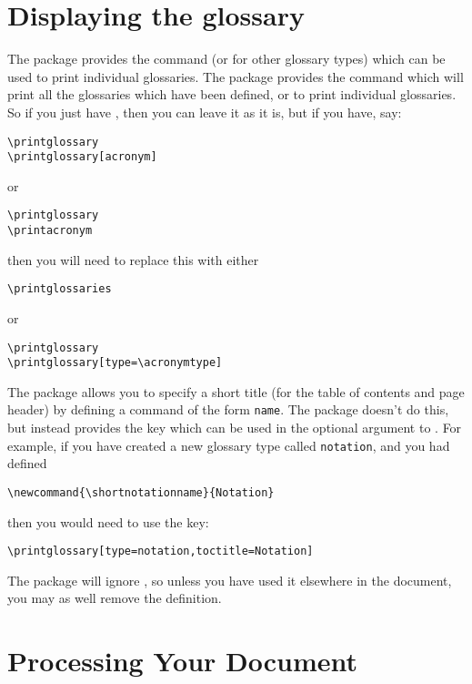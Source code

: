 \documentclass{nlctdoc}
\begin{document}
\section{Displaying the glossary}

The  package provides the command 
(or  for other glossary types) which
can be used to print individual glossaries. The 
package provides the command  which 
will print all the glossaries which have been defined, or
 to print individual glossaries.
So if you just have , then you can leave it as
it is, but if you have, say:
\begin{verbatim}
\printglossary
\printglossary[acronym]
\end{verbatim}
or
\begin{verbatim}
\printglossary
\printacronym
\end{verbatim}
then you will need to replace this with either
\begin{verbatim}
\printglossaries
\end{verbatim}
or 
\begin{verbatim}
\printglossary
\printglossary[type=\acronymtype]
\end{verbatim}

The  package allows you to specify a short title
(for the table of contents and page header) by defining a command of
the form \texttt{name}. The
 package doesn't do this, but instead provides
the  key which can be used in the
optional argument to . For example, if you have
created a new glossary type called \texttt{notation}, and you had
defined
\begin{verbatim}
\newcommand{\shortnotationname}{Notation}
\end{verbatim}
then you would need to use the  key:
\begin{verbatim}
\printglossary[type=notation,toctitle=Notation]
\end{verbatim}
The  package will ignore ,
so unless you have used it elsewhere in the document, you may as
well remove the definition.

\section{Processing Your Document}
\end{document}
